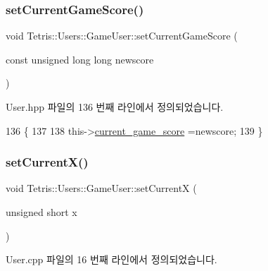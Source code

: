 \subsubsection{\texorpdfstring{set\+Current\+Game\+Score()}{setCurrentGameScore()}}
{\footnotesize\ttfamily void Tetris\+::\+Users\+::\+Game\+User\+::set\+Current\+Game\+Score (\begin{DoxyParamCaption}\item[{const unsigned long long}]{newscore }\end{DoxyParamCaption})\hspace{0.3cm}{\ttfamily [inline]}}



User.\+hpp 파일의 136 번째 라인에서 정의되었습니다.


\begin{DoxyCode}
136                                                                        \{
137                 
138                 this->\hyperlink{class_tetris_1_1_users_1_1_game_user_aae9d0156964b3872f7cd3917ae662ec2}{current\_game\_score} =newscore;
139             \}
\end{DoxyCode}
\mbox{\label{class_tetris_1_1_users_1_1_game_user_a2957358b1a6298f06c6c2e10cb89f623}} 
\subsubsection{\texorpdfstring{set\+Current\+X()}{setCurrentX()}\hspace{0.1cm}{\footnotesize\ttfamily [1/2]}}
{\footnotesize\ttfamily void Tetris\+::\+Users\+::\+Game\+User\+::set\+CurrentX (\begin{DoxyParamCaption}\item[{unsigned short}]{x }\end{DoxyParamCaption})}



User.\+cpp 파일의 16 번째 라인에서 정의되었습니다.


